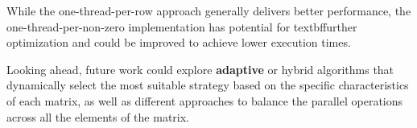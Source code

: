 \documentclass[conference]{IEEEtran}
\begin{document}
    While the one-thread-per-row approach generally delivers better performance,
    the one-thread-per-non-zero implementation has potential for 
    textbf{further optimization} and could be improved to achieve lower
    execution times.

    Looking ahead, future work could explore \textbf{adaptive} or hybrid
    algorithms that dynamically select the most suitable strategy based on the
    specific characteristics of each matrix, as well as different approaches to
    balance the parallel operations across all the elements of the matrix.

    
    
\end{document}
